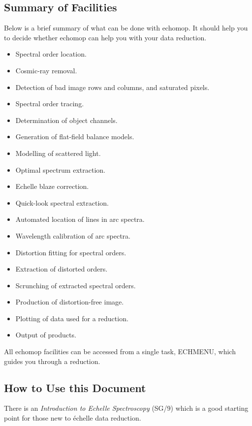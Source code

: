 \documentclass[11pt,twoside]{article}
\newcommand{\xref}[3]{#1}
\newcommand{\xlabel}[1]{}
\newcommand{\mlabel}[1]{\xlabel{#1}\label{#1}}
\begin{document}
\subsection{\mlabel{facilities}Summary of Facilities}

Below is a brief summary of what can be done with {\sc echomop}.
It should help you to decide whether {\sc echomop} can help you with your
data reduction.

\begin{itemize}

\item Spectral order location.
\item Cosmic-ray removal.
\item Detection of bad image rows and columns, and saturated pixels.
\item Spectral order tracing.
\item Determination of object channels.
\item Generation of flat-field balance models.
\item Modelling of scattered light.
\item Optimal spectrum extraction.
\item Echelle blaze correction.
\item Quick-look spectral extraction.
\item Automated location of lines in arc spectra.
\item Wavelength calibration of arc spectra.
\item Distortion fitting for spectral orders.
\item Extraction of distorted orders.
\item Scrunching of extracted spectral orders.
\item Production of distortion-free image.
\item Plotting of data used for a reduction.
\item Output of products.

\end{itemize}

All {\sc echomop} facilities can be accessed from a single task, ECHMENU,
which guides you through a reduction.


\subsection{ How to Use this Document}

There is an \xref{{\sl Introduction to Echelle Spectroscopy} (SG/9)}{sg9}{}
which is a good starting point for those new to \'{e}chelle data reduction.
\end{document}
